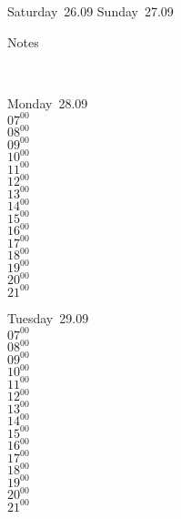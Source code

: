 \documentclass[11pt,a4paper]{book}\usepackage[]{graphicx}\usepackage[]{color}
\begin{document}
{{{{{{{{{{{{{\begin{tcolorbox}
\end{tcolorbox} 
\begin{tcolorbox}[height=(\textheight-10mm)/6]
Saturday~26.09
\tcblower
Sunday~27.09
\end{tcolorbox} %
\begin{tcolorbox}[height=(\textheight-10mm)/6,sidebyside=false]
Notes
\end{tcolorbox}
\clearpage
\vspace{2 mm}\\
\begin{tcolorbox}
Monday~28.09\\
{ 
  $07^{00}$\\
$08^{00}$\\
$09^{00}$\\
$10^{00}$\\
$11^{00}$\\
$12^{00}$\\
$13^{00}$\\
$14^{00}$\\
$15^{00}$\\
$16^{00}$\\
$17^{00}$\\
$18^{00}$\\
$19^{00}$\\
$20^{00}$\\
$21^{00}$}\\

\end{tcolorbox}
\begin{tcolorbox}
Tuesday~29.09\\
{ 
  $07^{00}$\\
$08^{00}$\\
$09^{00}$\\
$10^{00}$\\
$11^{00}$\\
$12^{00}$\\
$13^{00}$\\
$14^{00}$\\
$15^{00}$\\
$16^{00}$\\
$17^{00}$\\
$18^{00}$\\
$19^{00}$\\
$20^{00}$\\
$21^{00}$}\\


\end{tcolorbox}}}}}}}}}}}}}}
\end{document}

